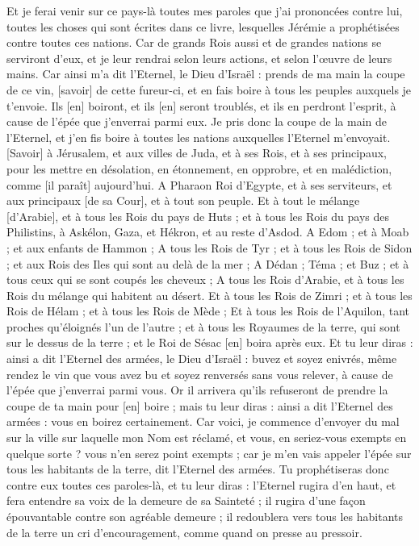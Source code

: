 \begin{multicols}{2}
Et je ferai venir sur ce pays-là toutes mes paroles que j'ai prononcées contre lui, toutes les choses qui sont écrites dans ce livre, lesquelles Jérémie a prophétisées contre toutes ces nations.
Car de grands Rois aussi et de grandes nations se serviront d'eux, et je leur rendrai selon leurs actions, et selon l'œuvre de leurs mains.
Car ainsi m'a dit l'Eternel, le Dieu d'Israël : prends de ma main la coupe de ce vin, [savoir] de cette fureur-ci, et en fais boire à tous les peuples auxquels je t'envoie.
Ils [en] boiront, et ils [en] seront troublés, et ils en perdront l'esprit, à cause de l'épée que j'enverrai parmi eux.
Je pris donc la coupe de la main de l'Eternel, et j'en fis boire à toutes les nations auxquelles l'Eternel m'envoyait.
[Savoir] à Jérusalem, et aux villes de Juda, et à ses Rois, et à ses principaux, pour les mettre en désolation, en étonnement, en opprobre, et en malédiction, comme [il paraît] aujourd'hui.
A Pharaon Roi d'Egypte, et à ses serviteurs, et aux principaux [de sa Cour], et à tout son peuple.
Et à tout le mélange [d'Arabie], et à tous les Rois du pays de Huts ; et à tous les Rois du pays des Philistins, à Askélon, Gaza, et Hékron, et au reste d'Asdod.
A Edom ; et à Moab ; et aux enfants de Hammon ;
A tous les Rois de Tyr ; et à tous les Rois de Sidon ; et aux Rois des Iles qui sont au delà de la mer ;
A Dédan ; Téma ; et Buz ; et à tous ceux qui se sont coupés les cheveux ;
A tous les Rois d'Arabie, et à tous les Rois du mélange qui habitent au désert.
Et à tous les Rois de Zimri ; et à tous les Rois de Hélam ; et à tous les Rois de Mède ;
Et à tous les Rois de l'Aquilon, tant proches qu'éloignés l'un de l'autre ; et à tous les Royaumes de la terre, qui sont sur le dessus de la terre ; et le Roi de Sésac [en] boira après eux.
Et tu leur diras : ainsi a dit l'Eternel des armées, le Dieu d'Israël : buvez et soyez enivrés, même rendez le vin que vous avez bu et soyez renversés sans vous relever, à cause de l'épée que j'enverrai parmi vous.
Or il arrivera qu'ils refuseront de prendre la coupe de ta main pour [en] boire ; mais tu leur diras : ainsi a dit l'Eternel des armées : vous en boirez certainement.
Car voici, je commence d'envoyer du mal sur la ville sur laquelle mon Nom est réclamé, et vous, en seriez-vous exempts en quelque sorte ? vous n'en serez point exempts ; car je m'en vais appeler l'épée sur tous les habitants de la terre, dit l'Eternel des armées.
Tu prophétiseras donc contre eux toutes ces paroles-là, et tu leur diras : l'Eternel rugira d'en haut, et fera entendre sa voix de la demeure de sa Sainteté ; il rugira d'une façon épouvantable contre son agréable demeure ; il redoublera vers tous les habitants de la terre un cri d'encouragement, comme quand on presse au pressoir.

\end{multicols}
